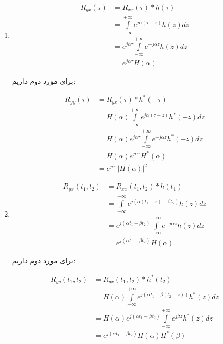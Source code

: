 \begin{enumerate}
	\item
	$$
	\begin{aligned}
	{R_{yx}}\left( \tau  \right) & = {R_{xx}}\left( \tau  \right)*h\left( \tau  \right)\\
	& = \int\limits_{ - \infty }^{ + \infty } {{e^{j\alpha \left( {\tau  - z} \right)}}h\left( z \right)dz} \\
	& = {e^{j\alpha \tau }}\int\limits_{ - \infty }^{ + \infty } {{e^{ - j\alpha z}}h\left( z \right)dz} \\
	& = {e^{j\alpha \tau }}H\left( \alpha  \right)
	\end{aligned}
	$$
	
	برای مورد دوم داریم:
	
	$$
	\begin{aligned}
	{R_{yy}}\left( \tau  \right) & = {R_{yx}}\left( \tau  \right) * {h^*}\left( { - \tau } \right)\\
	& = H\left( \alpha  \right)\int\limits_{ - \infty }^{ + \infty } {{e^{j\alpha \left( {\tau  - z} \right)}}{h^*}\left( { - z} \right)dz} \\
	& = H\left( \alpha  \right){e^{j\alpha \tau }}\int\limits_{ - \infty }^{ + \infty } {{e^{ - j\alpha z}}{h^*}\left( { - z} \right)dz} \\
	& = H\left( \alpha  \right){e^{j\alpha \tau }}{H^*}\left( \alpha  \right)\\
	& = {e^{j\alpha \tau }}{\left| {H\left( \alpha  \right)} \right|^2}
	\end{aligned}
	$$	
	
	\item
	
	$$
	\begin{aligned}
		{R_{yx}}\left( {{t_1},{t_2}} \right) & = {R_{xx}}\left( {{t_1},{t_2}} \right) * h\left( {{t_1}} \right)\\
		& = \int\limits_{ - \infty }^{ + \infty } {{e^{j\left( {\alpha \left( {{t_1} - z} \right) - \beta {t_2}} \right)}}h\left( z \right)dz} \\
		& = {e^{j\left( {\alpha {t_1} - \beta {t_2}} \right)}}\int\limits_{ - \infty }^{ + \infty } {{e^{ - j\alpha z}}h\left( z \right)dz} \\
		& = {e^{j\left( {\alpha {t_1} - \beta {t_2}} \right)}}H\left( \alpha  \right)
	\end{aligned}
	$$
	
	برای مورد دوم داریم:
	
	$$
	\begin{aligned}
		{R_{yy}}\left( {{t_1},{t_2}} \right) & = {R_{yx}}\left( {{t_1},{t_2}} \right) * {h^*}\left( {{t_2}} \right)\\
		& = H\left( \alpha  \right)\int\limits_{ - \infty }^{ + \infty } {{e^{j\left( {\alpha {t_1} - \beta \left( {{t_2} - z} \right)} \right)}}{h^*}\left( z \right)dz} \\
		& = H\left( \alpha  \right){e^{j\left( {\alpha {t_1} - \beta {t_2}} \right)}}\int\limits_{ - \infty }^{ + \infty } {{e^{j\beta z}}{h^*}\left( z \right)dz} \\
		& = {e^{j\left( {\alpha {t_1} - \beta {t_2}} \right)}}H\left( \alpha  \right){H^*}\left( \beta  \right)
	\end{aligned}
	$$
\end{enumerate}